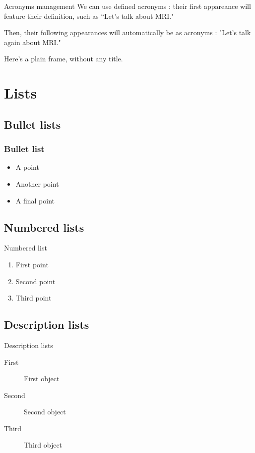 \documentclass[
  11pt, %
  aspectratio=169, %
]{beamer}
\begin{document}
\begin{frame}{Acronyms management}
  We can use defined acronyms : their first appareance will feature their definition, such as “Let's talk about \ac{MRI}."
  \vfill

  Then, their following appearances will automatically be as acronyms : "Let's talk again about \ac{MRI}."
\end{frame}

\begin{frame}

  Here’s a plain frame, without any title.

\end{frame}

\section{Lists}

\subsection{Bullet lists}
\begin{frame}
  \frametitle{Bullet list}

  \begin{itemize}
    \item A point
    \item Another point
    \item A final point
  \end{itemize}

\end{frame}

\subsection{Numbered lists}
\begin{frame}{Numbered list}
  \begin{enumerate}
    \item First point
    \item Second point
    \item Third point
  \end{enumerate}

\end{frame}

\subsection{Description lists}
\begin{frame}{Description lists}
  \begin{description}
    \item[First] First object
    \item[Second] Second object
    \item[Third] Third object
  \end{description}

\end{frame}
\end{document}
